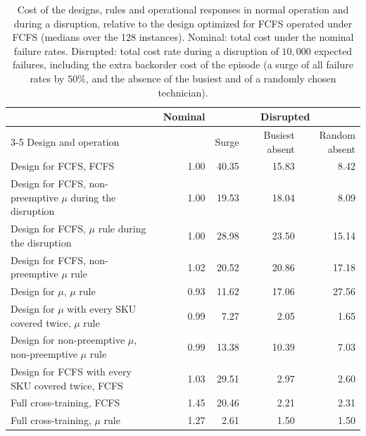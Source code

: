 \begin{table}[!htb]
\centering
\caption{Cost of the designs, rules and operational responses in normal operation and during a disruption, relative to the design optimized for FCFS operated under FCFS (medians over the 128 instances). Nominal: total cost under the nominal failure rates. Disrupted: total cost rate during a disruption of $10{,}000$ expected failures, including the extra backorder cost of the episode (a surge of all failure rates by $50\%$, and the absence of the busiest and of a randomly chosen technician).}
\label{tab:tradeoff}
\small
\begin{tabular}{@{}lrrrr@{}}
\toprule
& Nominal & \multicolumn{3}{c}{Disrupted} \\ \cmidrule(lr){3-5}
Design and operation & & Surge & Busiest absent & Random absent \\
\midrule
Design for FCFS, FCFS & 1.00 & 40.35 & 15.83 & 8.42 \\
Design for FCFS, non-preemptive $\mu$ during the disruption & 1.00 & 19.53 & 18.04 & 8.09 \\
Design for FCFS, $\mu$ rule during the disruption & 1.00 & 28.98 & 23.50 & 15.14 \\
Design for FCFS, non-preemptive $\mu$ rule & 1.02 & 20.52 & 20.86 & 17.18 \\
Design for $\mu$, $\mu$ rule & 0.93 & 11.62 & 17.06 & 27.56 \\
Design for $\mu$ with every SKU covered twice, $\mu$ rule & 0.99 & 7.27 & 2.05 & 1.65 \\
Design for non-preemptive $\mu$, non-preemptive $\mu$ rule & 0.99 & 13.38 & 10.39 & 7.03 \\
Design for FCFS with every SKU covered twice, FCFS & 1.03 & 29.51 & 2.97 & 2.60 \\
Full cross-training, FCFS & 1.45 & 20.46 & 2.21 & 2.31 \\
Full cross-training, $\mu$ rule & 1.27 & 2.61 & 1.50 & 1.50 \\
\bottomrule
\end{tabular}
\end{table}
